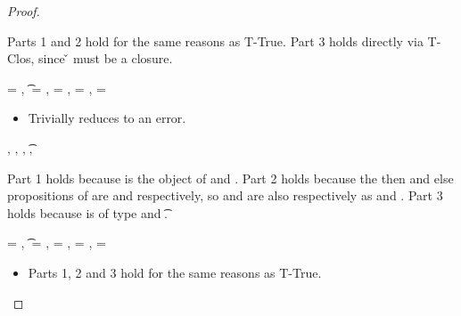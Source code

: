 \begin{lemma}
\begin{proof}
\begin{case}[T-Abs]
\begin{itemize}
\begin{subcase}[B-Abs]
        Parts 1 and 2 hold for the same reasons as T-True.
        Part 3 holds directly via T-Clos, since \v{} must be a closure.
      \end{subcase}
  \end{itemize}
\end{case}

\begin{case}[T-Error]
  \e{} = ,
  \t{} = \Bot,
  \thenprop{\prop{}} = \botprop{}, \elseprop{\prop{}} = \botprop{}, \object{} = \emptyobject{}


  \begin{itemize}
    \item[]
      \begin{subcase}[BE-Error] 
        \opsem {\openv{}} {\e{}} {}

        Trivially reduces to an error.
      \end{subcase}
  \end{itemize}
\end{case}

\begin{case}[T-Subsume]
  \judgement {\propenv{}} {\hastype {\e{}} {\tp{}}}
             {\filterset {\thenprop {\propp{}}}
                         {\elseprop {\propp{}}}}
             {\objectp{}},
\inpropenv {\propenv{}, {\thenprop {\propp{}}}} {\thenprop {\prop{}}},
\inpropenv {\propenv{}, {\elseprop {\propp{}}}} {\elseprop {\prop{}}},
\inpropenv {} {\issubtype {\tp{}} {\t{}}},
\inpropenv {} {\issubtype {\objectp{}} {\object{}}}

Part 1 holds because \objectp{} is the object of \e{}
and \inpropenv {} {\issubtype {\objectp{}} {\object{}}}.
Part 2 holds because 
the then and else propositions of \e{} are
{\thenprop {\propp{}}} and 
{\elseprop {\propp{}}} respectively, so
{\thenprop {\prop{}}} and
{\elseprop {\prop{}}} are also respectively as 
\inpropenv {\propenv{}, {\thenprop {\propp{}}}} {\thenprop {\prop{}}} and
\inpropenv {\propenv{}, {\elseprop {\propp{}}}} {\elseprop {\prop{}}}.
Part 3 holds because \e{} is of type \tp{} and 
\inpropenv {} {\issubtype {\tp{}} {\t{}}}.

\end{case}

\begin{case}[T-Const]\e{} = {\const{}},
  \t{} = {\constanttype{\const{}}},
{\thenprop{\prop{}}} = {\topprop{}},
{\elseprop{\prop{}}} = {\botprop{}},
{\object{}} = {\emptyobject{}}

  \begin{itemize}
    \item[] 
      \begin{subcase}[B-Val]
        Parts 1, 2 and 3 hold for the same reasons as T-True. 
      \end{subcase}
  \end{itemize}
\end{case}

\end{proof}

\end{lemma}

